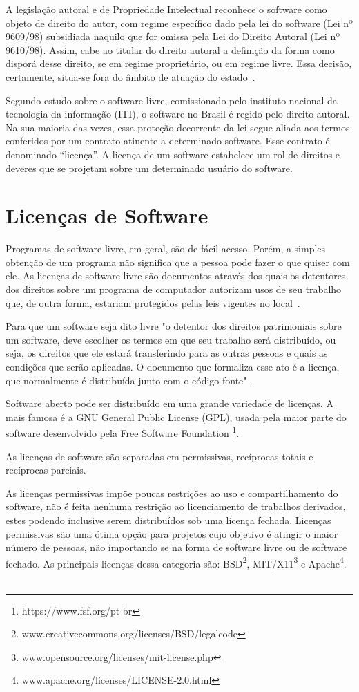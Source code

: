 A legislação autoral e de Propriedade Intelectual reconhece o software como objeto 
de direito do autor, com regime específico dado pela lei do software (Lei nº 9609/98)
subsidiada naquilo que for omissa pela Lei do Direito Autoral (Lei nº 9610/98).
%
Assim, cabe ao titular do direito autoral a definição da forma como disporá desse
direito, se em regime proprietário, ou em regime livre. Essa decisão, certamente,
situa-se fora do âmbito de atuação do estado~\cite{junior2005software}.

Segundo estudo sobre o software livre, comissionado pelo instituto nacional da 
tecnologia da informação (ITI), o software no Brasil é regido pelo direito autoral. 
Na sua maioria das vezes, essa proteção decorrente da lei segue aliada aos termos 
conferidos por um contrato atinente a determinado software. Esse contrato é 
denominado “licença”. A licença de um software estabelece um rol de direitos e 
deveres que se projetam sobre um determinado usuário do software.


\section{Licenças de Software}

Programas de software livre, em geral, são de fácil acesso. Porém, a simples obtenção
de um programa não significa que a pessoa pode fazer o que quiser com ele. As licenças
de software livre são documentos através dos quais os detentores dos direitos sobre um
programa de computador autorizam usos de seu trabalho que, de outra forma, estariam
protegidos pelas leis vigentes no local~\cite{sabino2009licenccas}.

Para que um software seja dito livre "o detentor dos direitos patrimoniais 
sobre um software, deve escolher os termos em que seu trabalho será distribuído, 
ou seja, os direitos que ele estará transferindo para as outras pessoas e quais as 
condições que serão aplicadas. O documento que formaliza esse ato é a licença, 
que normalmente é distribuída junto com o código fonte"~\cite{sabino2009licenccas}.

Software aberto pode ser distribuído em uma grande variedade de licenças.
A mais famosa é a GNU General Public License (GPL), usada pela maior
parte do software desenvolvido pela Free Software Foundation \footnote{https://www.fsf.org/pt-br}.

As licenças de software são separadas em permissivas, recíprocas totais e recíprocas
parciais.

As licenças permissivas impõe poucas restrições ao uso e compartilhamento do
software, não é feita nenhuma restrição ao licenciamento de trabalhos derivados, 
estes podendo inclusive serem distribuídos sob uma licença fechada. Licenças permissivas são 
uma ótima opção para projetos cujo objetivo é atingir o maior número de pessoas, 
não importando se na forma de software livre ou de software fechado. As principais 
licenças dessa categoria são: BSD\footnote{www.creativecommons.org/licenses/BSD/legalcode},
MIT/X11\footnote{www.opensource.org/licenses/mit-license.php} e Apache\footnote{www.apache.org/licenses/LICENSE-2.0.html}.
~\cite{sabino2009licenccas}

